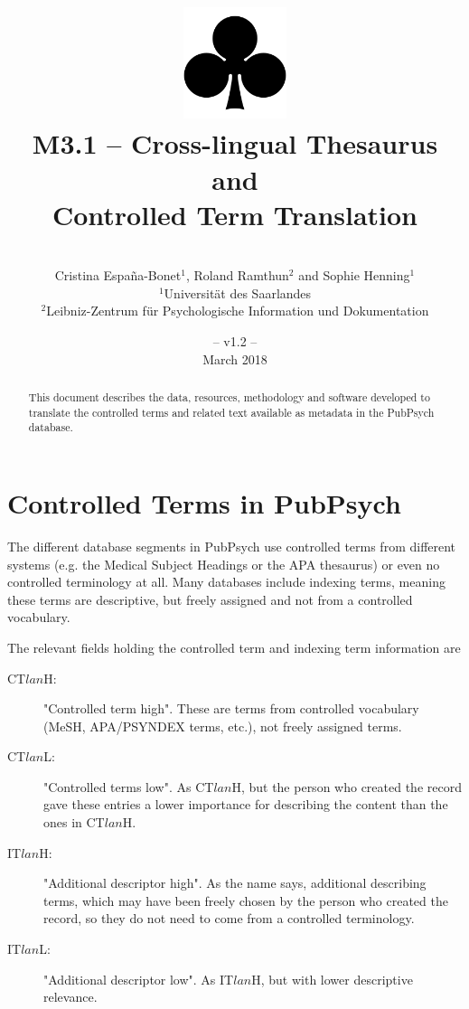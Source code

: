 \documentclass[a4paper,11pt]{article}
\title{
	\includegraphics[width=3cm]{./img/200px-SuitClubs.png} \\
	\Huge M3.1 -- Cross-lingual Thesaurus and \\ Controlled Term Translation \\ 
}
\author{\vspace*{1cm}\\ \LARGE Cristina Espa\~na-Bonet$^{1}$, Roland Ramthun$^{2}$ and Sophie Henning$^{1}$ \medskip \\ 
	\Large $^{1}$Universit\"at des Saarlandes\\ \Large $^{2}$Leibniz-Zentrum für Psychologische Information und Dokumentation}
\date{\vspace*{2cm} -- v1.2 --\\March 2018}
\begin{document}
	
	\clearpage\maketitle
	\thispagestyle{empty}
	
	\vspace*{5cm}
	\begin{abstract}
		This document describes the data, resources, methodology and software developed to translate the controlled terms and related text available as metadata in the PubPsych database.
	\end{abstract}
	
	\newpage
	\tableofcontents
	\clearpage
	
	
	
	\section{Controlled Terms in PubPsych}
	\label{s:ct}
	
	The different database segments in PubPsych use controlled terms from different systems (e.g. the Medical Subject Headings or the APA thesaurus) or even no controlled terminology at all. Many databases include indexing terms, meaning these terms are descriptive, but freely assigned and not from a controlled vocabulary.
	
	\bigskip
	\noindent The relevant fields holding the controlled term and indexing term information are
		\begin{description}
		\item[CT\mbox{\boldmath $lan$}H:] "Controlled term high". These are terms from controlled vocabulary (MeSH, APA/PSYNDEX terms, etc.), not freely assigned terms.
		\item[CT\mbox{\boldmath $lan$}L:] "Controlled terms low". As CT$lan$H, but the person who created the record gave these entries a lower importance for describing the content than the ones in CT$lan$H.
		\item[IT\mbox{\boldmath $lan$}H:] "Additional descriptor high". As the name says, additional describing terms, which may have been freely chosen by the person who created the record, so they do not need to come from a controlled terminology.
		\item[IT\mbox{\boldmath $lan$}L:] "Additional descriptor low". As IT$lan$H, but with lower descriptive relevance.
	\end{description}
	
\end{document}
